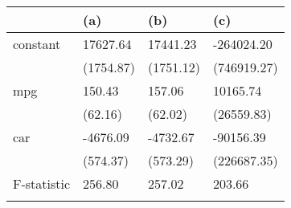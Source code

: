 \begin{tabular}{llll}
\toprule
{} &        (a) &        (b) &          (c) \\
\midrule
constant    &   17627.64 &   17441.23 &   -264024.20 \\
            &  (1754.87) &  (1751.12) &  (746919.27) \\
mpg         &     150.43 &     157.06 &     10165.74 \\
            &    (62.16) &    (62.02) &   (26559.83) \\
car         &   -4676.09 &   -4732.67 &    -90156.39 \\
            &   (574.37) &   (573.29) &  (226687.35) \\
F-statistic &     256.80 &     257.02 &       203.66 \\
            &            &            &              \\
\bottomrule
\end{tabular}
